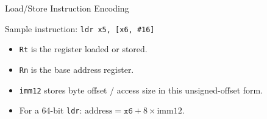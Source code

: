 \documentclass[aspectratio=169,11pt,t]{beamer}
\newcommand{\code}[1]{\texttt{#1}}
\newcommand{\bfld}[5]{%
  \pgfmathsetmacro{\cx}{#1 + #3/2}%
  \fill[#5] (#1,#2) rectangle ++(#3,0.72);%
  \draw[navy,line width=0.7pt] (#1,#2) rectangle ++(#3,0.72);%
  \node[font=\scriptsize\ttfamily,text height=1.5ex,text depth=0.35ex,align=center,text=darkgray] at (\cx,#2+0.36) {#4};%
}
\newcommand{\bitnote}[3]{%
  \node[font=\tiny,text height=1.5ex,text depth=0.35ex,align=center,text=darkgray] at (#1,#2) {#3};%
}
\begin{document}
\begin{frame}{Load/Store Instruction Encoding}

\begin{center}
Sample instruction: \code{ldr x5, [x6, \#16]}
\end{center}

\vspace{0.1cm}

\begin{center}
\end{center}

\vspace{0.1cm}

\begin{itemize}\setlength{\itemsep}{4pt}
  \item \code{Rt} is the register loaded or stored.
  \item \code{Rn} is the base address register.
  \item \code{imm12} stores byte offset / access size in this unsigned-offset form.
  \item For a 64-bit \code{ldr}: \(\text{address} = \code{x6} + 8 \times \text{imm12}\).
\end{itemize}

\end{frame}

\end{document}
